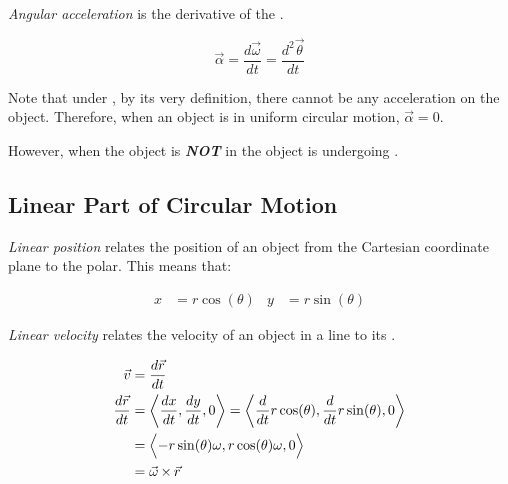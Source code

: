 \begin{definition}\label{def:Angular Acceleration}
  \emph{Angular acceleration} is the derivative of the .

  \begin{equation}\label{eq:Angular Acceleration}
    \vec{\alpha} = \frac{d \vec{\omega}}{dt} = \frac{d^{2} \vec{\theta}}{dt}
  \end{equation}

  \begin{remark}
    Note that under , by its very definition, there cannot be any acceleration on the object.
    Therefore, when an object is in uniform circular motion, $\vec{\alpha} = 0$.

    However, when the object is \textbf{\emph{NOT}} in  the object is undergoing .
  \end{remark}
\end{definition}

\subsection{Linear Part of Circular Motion}\label{subsec:Linear Circular Motion}
\begin{definition}\label{def:Linear Position}
  \emph{Linear position} relates the position of an object from the Cartesian coordinate plane to the polar.
  This means that:

  \begin{equation}\label{eq:Linear Position}
    \begin{aligned}
      x &= r \cos ( \theta ) & y &= r \sin ( \theta )
    \end{aligned}
  \end{equation}
\end{definition}

\begin{definition}\label{def:Linear Velocity}
  \emph{Linear velocity} relates the velocity of an object in a line to its .

  \begin{equation}\label{eq:Linear Velocity}
    \begin{aligned}
      \vec{v} &= \frac{d \vec{r}}{dt} \\
      \frac{d \vec{r}}{dt} &= \biggl \langle \frac{dx}{dt}, \frac{dy}{dt}, 0 \biggr \rangle = \biggl \langle \frac{d}{dt} r \cos ( \theta ), \frac{d}{dt} r \sin ( \theta ), 0 \biggr \rangle \\
      &= \Bigl \langle -r \sin ( \theta ) \omega, r \cos ( \theta ) \omega, 0 \Bigr \rangle \\
      &= \vec{\omega} \operatorname{\times} \vec{r}
    \end{aligned}
  \end{equation}
\end{definition}

